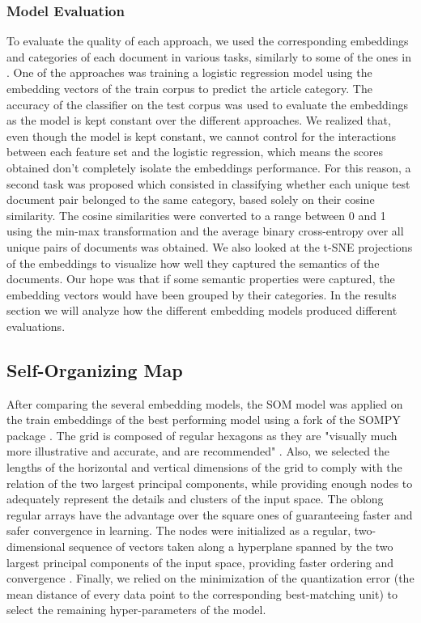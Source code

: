 \documentclass[a4paper]{article}
\begin{document}
\subsubsection*{Model Evaluation}
To evaluate the quality of each approach, we used the corresponding embeddings and categories of each document in various tasks, similarly to some of the ones in \citet{conneau2018}. One of the approaches was training a logistic regression model using the embedding vectors of the train corpus to predict the article category. The accuracy of the classifier on the test corpus was used to evaluate the embeddings as the model is kept constant over the different approaches. We realized that, even though the model is kept constant, we cannot control for the interactions between each feature set and the logistic regression, which means the scores obtained don't completely isolate the embeddings performance. For this reason, a second task was proposed which consisted in classifying whether each unique test document pair belonged to the same category, based solely on their cosine similarity. The cosine similarities were converted to a range between 0 and 1 using the min-max transformation and the average binary cross-entropy over all unique pairs of documents was obtained. We also looked at the t-SNE projections of the embeddings to visualize how well they captured the semantics of the documents. Our hope was that if some semantic properties were captured, the embedding vectors would have been grouped by their categories. In the results section we will analyze how the different embedding models produced different evaluations.

\subsection*{Self-Organizing Map}
After comparing the several embedding models, the SOM model was applied on the train embeddings of the best performing model using a fork of the SOMPY package \citep{moosavi2014}. The grid is composed of regular hexagons as they are "visually much more illustrative and accurate, and are recommended" \citep{kohonen2013}. Also, we selected the lengths of the horizontal and vertical dimensions of the grid to comply with the relation of the two largest principal components, while providing enough nodes to adequately represent the details and clusters of the input space. The oblong regular arrays have the advantage over the square ones of guaranteeing faster and safer convergence in learning. The nodes were initialized as a regular, two-dimensional sequence of vectors taken along a hyperplane spanned by the two largest principal components of the input space, providing faster ordering and convergence \citep{kohonen2001}. Finally, we relied on the minimization of the quantization error (the mean distance of every data point to the corresponding best-matching unit) to select the remaining hyper-parameters of the model.
\end{document}
